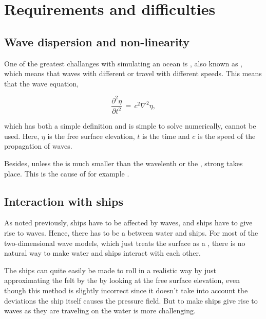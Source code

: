 \chapter{Requirements and difficulties}

\section{Wave dispersion and non-linearity}

One of the greatest challanges with simulating an ocean is , also known as , which means that waves with different \wavelengths or \frequencies travel with different speeds. This means that the wave equation,

\begin{equation} \label{eq:wave_equation}
\frac{\partial^2 \eta}{\partial t^2} \,=\, c^2\nabla^2\eta,
\end{equation}

which has both a simple definition and is simple to solve numerically, cannot be used. Here, $\eta$ is the free surface elevation, $t$ is the time and $c$ is the speed of the propagation of waves.

Besides, unless the  is much smaller than the wavelenth or the , strong  takes place. This is the cause of for example .

\section{Interaction with ships}

As noted previously, ships have to be affected by waves, and ships have to give rise to waves. Hence, there has to be a  between water and ships. For most of the two-dimensional wave models, which just treats the surface as a , there is no natural way to make water and ships interact with each other.

The ships can quite easily be made to roll in a realistic way by just approximating the  felt by the  by looking at the free surface elevation, even though this method is slightly incorrect since it doesn't take into account the deviations the ship itself causes the pressure field. But to make ships give rise to waves as they are traveling on the water is more challenging.

